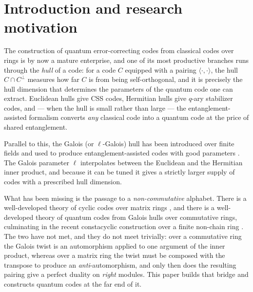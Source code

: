 \section{Introduction and research motivation}
\label{sec:intro}

The construction of quantum error-correcting codes from classical codes over
rings is by now a mature enterprise, and one of its most productive branches
runs through the \emph{hull} of a code: for a code $C$ equipped with a pairing
$\langle\cdot,\cdot\rangle$, the hull $C\cap C^{\perp}$ measures how far $C$ is
from being self-orthogonal, and it is precisely the hull dimension that
determines the parameters of the quantum code one can extract. Euclidean hulls
give CSS codes, Hermitian hulls give $q$-ary stabilizer codes, and --- when the
hull is small rather than large --- the entanglement-assisted formalism converts
\emph{any} classical code into a quantum code at the price of shared
entanglement.

Parallel to this, the Galois (or $\ell$-Galois) hull has been introduced over
finite fields \cite{FanZhang2017GaloisSelfDual,LiuPan2020GaloisHulls} and used
to produce entanglement-assisted codes with good parameters
\cite{Cao2021MDSGaloisHulls}. The Galois parameter $\ell$ interpolates between
the Euclidean and the Hermitian inner product, and because it can be tuned it
gives a strictly larger supply of codes with a prescribed hull dimension.

What has been missing is the passage to a \emph{non-commutative} alphabet. There
is a well-developed theory of cyclic codes over matrix rings
\cite{Alahmadi2013CyclicM2F2,LuoParampalli2018M2F2uF2,Dinh2024CyclicRingsOfMatrices,
JoshiPatelPrakash2026M4}, and there is a well-developed theory of quantum codes
from Galois hulls over commutative rings, culminating in the recent
constacyclic construction over a finite non-chain ring
\cite{ZhangKongZheng2026QuantumGaloisHulls}. The two have not met, and they do
not meet trivially: over a commutative ring the Galois twist is an
automorphism applied to one argument of the inner product, whereas over a matrix
ring the twist must be composed with the transpose to produce an
\emph{anti}-automorphism, and only then does the resulting pairing give a
perfect duality on \emph{right} modules. This paper builds that bridge and
constructs quantum codes at the far end of it.


